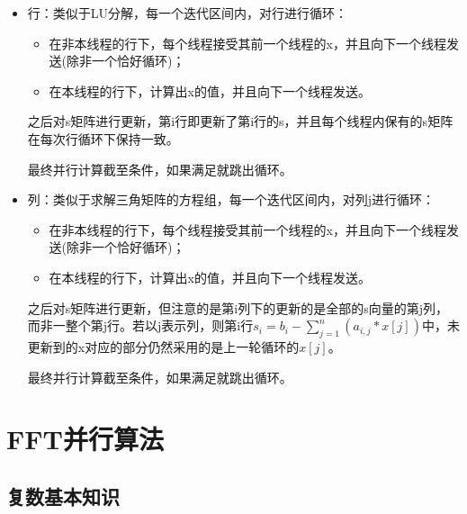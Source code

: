 \documentclass[UTF8]{article}%
\begin{document}
\begin{itemize}
    \item 行：类似于LU分解，每一个迭代区间内，对行进行循环：
    
    {
        \begin{itemize}
            \item 在非本线程的行下，每个线程接受其前一个线程的x，并且向下一个线程发送(除非一个恰好循环)；
            \item 在本线程的行下，计算出x的值，并且向下一个线程发送。
        \end{itemize}
    }
   
    之后对s矩阵进行更新，第i行即更新了第i行的s，并且每个线程内保有的s矩阵在每次行循环下保持一致。

    最终并行计算截至条件，如果满足就跳出循环。

    \item 列：类似于求解三角矩阵的方程组，每一个迭代区间内，对列j进行循环：
    
    {
        \begin{itemize}
            \item 在非本线程的行下，每个线程接受其前一个线程的x，并且向下一个线程发送(除非一个恰好循环)；
            \item 在本线程的行下，计算出x的值，并且向下一个线程发送。
        \end{itemize}
    }

    之后对s矩阵进行更新，但注意的是第i列下的更新的是全部的s向量的第j列，而非一整个第j行。若以j表示列，则第i行$s_i=b_i-\sum_{j = 1}^{n} (a_{i,j}*x[j]) $中，未更新到的x对应的部分仍然采用的是上一轮循环的$x[j]$。

    最终并行计算截至条件，如果满足就跳出循环。

\end{itemize}

\section{FFT并行算法}

\subsection{复数基本知识}
\end{document}
